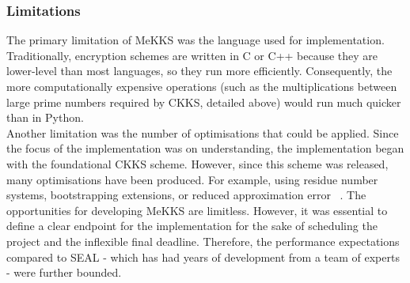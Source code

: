 \setlength{\leftskip}{0cm}
\subsubsection{Limitations}
\label{sec:mekksLimitations}
\setlength{\leftskip}{0.5cm}
\indent \indent
The primary limitation of MeKKS was the language used for implementation. Traditionally, encryption schemes are written in C or C++ because they are lower-level than most languages, so they run more efficiently. Consequently, the more computationally expensive operations (such as the multiplications between large prime numbers required by CKKS, detailed above) would run much quicker than in Python. 
\smallskip \\ \indent
Another limitation was the number of optimisations that could be applied. Since the focus of the implementation was on understanding, the implementation began with the foundational CKKS scheme. However, since this scheme was released, many optimisations have been produced. For example, using residue number systems, bootstrapping extensions, or reduced approximation error ~\cite{RNS,BootstrappingHEAAN, RAE}. The opportunities for developing MeKKS are limitless. However, it was essential to define a clear endpoint for the implementation for the sake of scheduling the project and the inflexible final deadline. Therefore, the performance expectations compared to SEAL - which has had years of development from a team of experts - were further bounded.

\setlength{\leftskip}{0cm}
